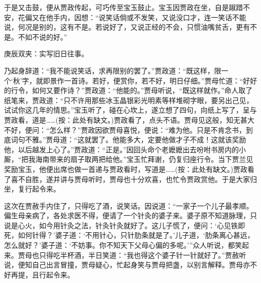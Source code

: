 \begin{parag}
    于是又击鼓，便从贾政传起，可巧传至宝玉鼓止。宝玉因贾政在坐，自是踧踖不安，花偏又在他手内，因想：“说笑话倘或不发笑，又说没口才，连一笑话不能说，何况是别的，这有不是。若说好了，又说正经的不会，只惯油嘴贫舌，更有不是。不如不说的好。”\begin{note}庚辰双夹：实写旧日往事。\end{note}乃起身辞道：“我不能说笑话，求再限别的罢了。”贾政道：“既这样，限一个‘秋’字，就即景作一首诗。若好，便赏你，若不好，明日仔细。”贾母忙道：“好好的行令，如何又要作诗？”贾政道：“他能的。”贾母听说，“既这样就作。”命人取了纸笔来，贾政道：“只不许用那些冰玉晶银彩光明素等样堆砌字眼，要另出己见，试试你这几年的情思。”宝玉听了，碰在心坎上，遂立想了四句，向纸上写了，呈与贾政看，道是……(按：此处有缺文。)贾政看了，点头不语。贾母见这般，知无甚大不好，便问：“怎么样？”贾政因欲贾母喜悦，便说：“难为他。只是不肯念书，到底词句不雅。”贾母道：“这就罢了。他能多大，定要他做才子不成！这就该奖励他，以后越发上心了。”贾政道：“正是。”因回头命个老嬷嬷出去吩咐书房内的小厮，“把我海南带来的扇子取两把给他。”宝玉忙拜谢，仍复归座行令。当下贾兰见奖励宝玉，他便出席也做一首递与贾政看时，写道是……(按：此处有缺文。)贾政看了喜不自胜，遂并讲与贾母听时，贾母也十分欢喜，也忙令贾政赏他。于是大家归坐，复行起令来。
\end{parag}


\begin{parag}
    这次在贾赦手内住了，只得吃了酒，说笑话。因说道：“一家子一个儿子最孝顺。偏生母亲病了，各处求医不得，便请了一个针灸的婆子来。婆子原不知道脉理，只说是心火，如今用针灸之法，针灸针灸就好了。这儿子慌了，便问：‘心见铁即死，如何针得？’婆子道：‘不用针心，只针肋条就是了。’儿子道，‘肋条离心甚远，怎么就好？’婆子道：‘不妨事。你不知天下父母心偏的多呢。’”众人听说，都笑起来。贾母也只得吃半杯酒，半日笑道：“我也得这个婆子针一针就好了。”贾赦听说，便知自己出言冒撞，贾母疑心，忙起身笑与贾母把盏，以别言解释。贾母亦不好再提，且行起令来。
\end{parag}


